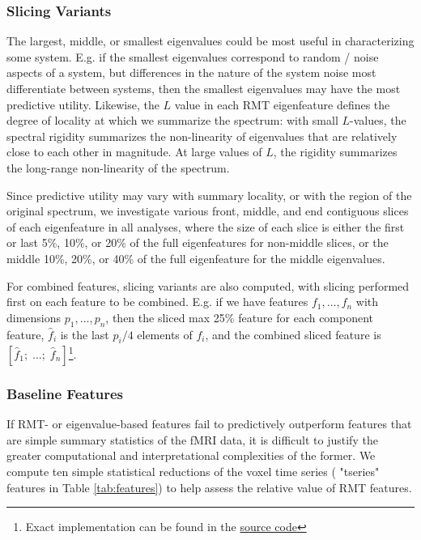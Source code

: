 \documentclass[12pt]{spieman}  %
\begin{document}
\begin{spacing}{2}
\subsubsection{Slicing Variants}

The largest, middle, or smallest eigenvalues could be most useful in
characterizing some system. E.g. if the smallest eigenvalues correspond to
random / noise aspects of a system, but differences in the nature of the system
noise most differentiate between systems, then the smallest eigenvalues may
have the most predictive utility.  Likewise, the \(L\) value in each RMT
eigenfeature defines the degree of locality at which we summarize the spectrum:
with small \(L\)-values, the spectral rigidity summarizes the non-linearity of
eigenvalues that are relatively close to each other in magnitude. At large
values of \(L\), the rigidity summarizes the long-range non-linearity of the
spectrum.

Since predictive utility may vary with summary locality, or with the region of
the original spectrum, we investigate various front, middle, and end contiguous
slices of each eigenfeature in all analyses, where the size of each slice is
either the first or last 5\%, 10\%, or 20\% of the full eigenfeatures for
non-middle slices, or the middle 10\%, 20\%, or 40\% of the full eigenfeature for
the middle eigenvalues.

For combined features, slicing variants are also computed, with slicing
performed first on each feature to be combined. E.g. if we have features \(f_1,
\dots,  f_n\) with dimensions \(p_1, \dots, p_n\), then the sliced max 25\%
feature for each component feature, \(\hat{f}_i\) is the last \(p_i / 4\)
elements of \(f_i\), and the combined sliced feature is  \([\hat{f}_1;\;
\dots;\; \hat{f}_n]\)\footnote{Exact implementation can be found in the
\href{https://github.com/DM-Berger/random-matrix-fmri/blob/7c9e4187f582dedee728cd7193b8894d928c2f00/code/rmt/updated\_predict.py\#L182-L213}{source code}}.



\subsubsection{Baseline Features}
\label{sec:baselines}

If RMT- or eigenvalue-based features fail to predictively outperform features
that are simple summary statistics of the fMRI data, it is difficult to justify
the greater computational and interpretational complexities of the former. We
compute ten simple statistical reductions of the voxel time series ( "tseries"
features in Table \ref{tab:features}) to help assess the relative value of RMT
features.


\end{spacing}
\end{document}
